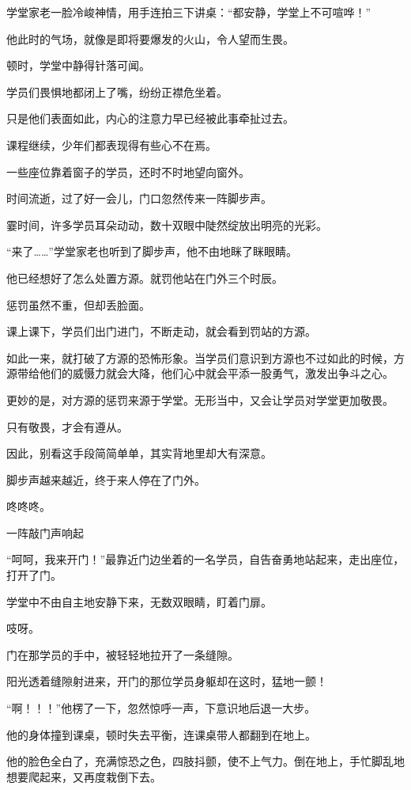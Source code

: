 \begin{this_body}
学堂家老一脸冷峻神情，用手连拍三下讲桌：“都安静，学堂上不可喧哗！”

他此时的气场，就像是即将要爆发的火山，令人望而生畏。

顿时，学堂中静得针落可闻。

学员们畏惧地都闭上了嘴，纷纷正襟危坐着。

只是他们表面如此，内心的注意力早已经被此事牵扯过去。

课程继续，少年们都表现得有些心不在焉。

一些座位靠着窗子的学员，还时不时地望向窗外。

时间流逝，过了好一会儿，门口忽然传来一阵脚步声。

霎时间，许多学员耳朵动动，数十双眼中陡然绽放出明亮的光彩。

“来了……”学堂家老也听到了脚步声，他不由地眯了眯眼睛。

他已经想好了怎么处置方源。就罚他站在门外三个时辰。

惩罚虽然不重，但却丢脸面。

课上课下，学员们出门进门，不断走动，就会看到罚站的方源。

如此一来，就打破了方源的恐怖形象。当学员们意识到方源也不过如此的时候，方源带给他们的威慑力就会大降，他们心中就会平添一股勇气，激发出争斗之心。

更妙的是，对方源的惩罚来源于学堂。无形当中，又会让学员对学堂更加敬畏。

只有敬畏，才会有遵从。

因此，别看这手段简简单单，其实背地里却大有深意。

脚步声越来越近，终于来人停在了门外。

咚咚咚。

一阵敲门声响起

“呵呵，我来开门！”最靠近门边坐着的一名学员，自告奋勇地站起来，走出座位，打开了门。

学堂中不由自主地安静下来，无数双眼睛，盯着门扉。

吱呀。

门在那学员的手中，被轻轻地拉开了一条缝隙。

阳光透着缝隙射进来，开门的那位学员身躯却在这时，猛地一颤！

“啊！！！”他楞了一下，忽然惊呼一声，下意识地后退一大步。

他的身体撞到课桌，顿时失去平衡，连课桌带人都翻到在地上。

他的脸色全白了，充满惊恐之色，四肢抖颤，使不上气力。倒在地上，手忙脚乱地想要爬起来，又再度栽倒下去。


\end{this_body}
